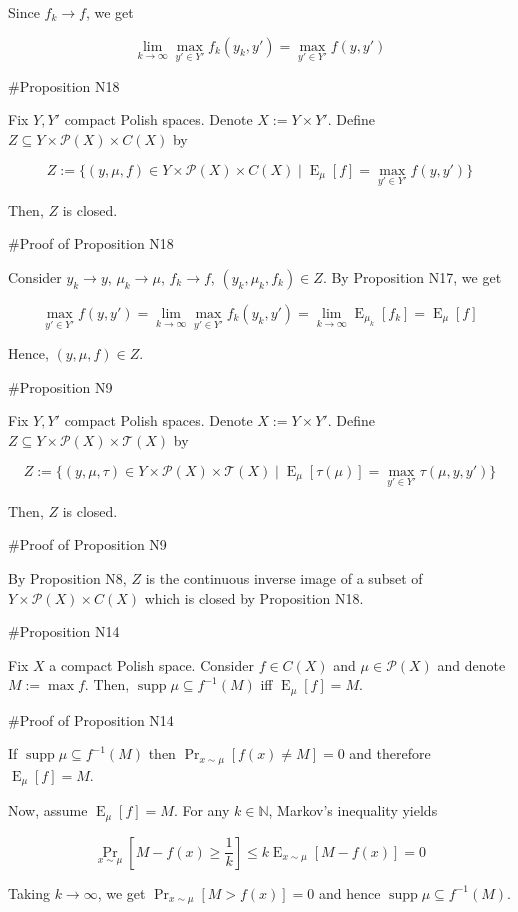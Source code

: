 \documentclass[a4paper]{article}
\DeclareMathOperator{\Supp}{supp}
\DeclareMathOperator{\Prb}{Pr}
\DeclareMathOperator{\E}{E}
\newcommand{\Nats}{\mathbb{N}}
\newcommand{\Prob}{\mathcal{P}}
\newcommand{\T}{\mathcal{T}}
\begin{document}
Since ${f_k \rightarrow f}$, we get

$${\lim_{k \rightarrow \infty} \max_{y' \in Y'} f_k(y_k,y') = \max_{y' \in Y'} f(y,y')}$$

\#Proposition N18

Fix ${Y,Y'}$ compact Polish spaces. Denote ${X:=Y \times Y'}$. Define ${Z \subseteq Y \times \Prob(X) \times C(X)}$ by

$$Z:=\{(y,\mu,f) \in Y \times \Prob(X) \times C(X) \mid \E_\mu[f] = \max_{y' \in Y'} f(y,y')\}$$

Then, ${Z}$ is closed.

\#Proof of Proposition N18

Consider ${y_k \rightarrow y}$, ${\mu_k \rightarrow \mu}$, ${f_k \rightarrow f}$, ${(y_k,\mu_k,f_k) \in Z}$. By Proposition N17, we get

$$\max_{y' \in Y'} f(y,y') = \lim_{k \rightarrow \infty} \max_{y' \in Y'} f_k(y_k,y')= \lim_{k \rightarrow \infty} \E_{\mu_k}[f_k] = \E_{\mu}[f]$$

Hence, ${(y,\mu,f) \in Z}$.

\#Proposition N9

Fix ${Y,Y'}$ compact Polish spaces. Denote ${X:=Y \times Y'}$. Define ${Z \subseteq Y \times \Prob(X) \times \T(X)}$ by

$$Z:=\{(y,\mu,\tau) \in Y \times \Prob(X) \times \T(X) \mid \E_\mu[\tau(\mu)] = \max_{y' \in Y'} \tau(\mu,y,y')\}$$

Then, ${Z}$ is closed.

\#Proof of Proposition N9

By Proposition N8, ${Z}$ is the continuous inverse image of a subset of ${Y \times \Prob(X) \times C(X)}$ which is closed by Proposition N18.

\#Proposition N14

Fix ${X}$ a compact Polish space. Consider ${f \in C(X)}$ and ${\mu \in \Prob(X)}$ and denote ${M := \max f}$. Then, ${\Supp \mu \subseteq f^{-1}(M)}$ iff ${\E_\mu[f] = M}$.

\#Proof of Proposition N14

If ${\Supp \mu \subseteq f^{-1}(M)}$ then $\Prb_{x\sim \mu}[f(x) \ne M] = 0$ and therefore ${\E_\mu[f] = M}$.

Now, assume ${\E_\mu[f] = M}$. For any ${k \in \Nats}$, Markov's inequality yields 

$$\Prb_{x\sim \mu}[M - f(x) \geq \frac{1}{k}] \leq k\E_{x \sim \mu}[M - f(x)] = 0$$

Taking $k \rightarrow \infty$, we get ${\Prb_{x\sim \mu}[M > f(x)] = 0}$ and hence ${\Supp \mu \subseteq f^{-1}(M)}$.
\end{document}
